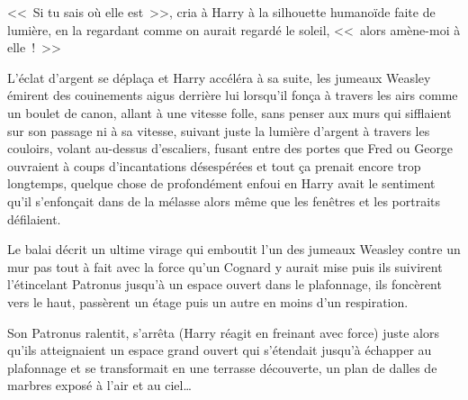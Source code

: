 <<~Si tu sais où elle est~>>, cria à Harry à la silhouette humanoïde faite de lumière, en la regardant comme on aurait regardé le soleil, <<~alors amène-moi à elle~!~>>

L'éclat d'argent se déplaça et Harry accéléra à sa suite, les jumeaux Weasley émirent des couinements aigus derrière lui lorsqu'il fonça à travers les airs comme un boulet de canon, allant à une vitesse folle, sans penser aux murs qui sifflaient sur son passage ni à sa vitesse, suivant juste la lumière d'argent à travers les couloirs, volant au-dessus d'escaliers, fusant entre des portes que Fred ou George ouvraient à coups d'incantations désespérées et tout ça prenait encore trop longtemps, quelque chose de profondément enfoui en Harry avait le sentiment qu'il s'enfonçait dans de la mélasse alors même que les fenêtres et les portraits défilaient.

Le balai décrit un ultime virage qui emboutit l'un des jumeaux Weasley contre un mur pas tout à fait avec la force qu'un Cognard y aurait mise puis ils suivirent l'étincelant Patronus jusqu'à un espace ouvert dans le plafonnage, ils foncèrent vers le haut, passèrent un étage puis un autre en moins d'un respiration.

Son Patronus ralentit, s'arrêta (Harry réagit en freinant avec force) juste alors qu'ils atteignaient un espace grand ouvert qui s'étendait jusqu'à échapper au plafonnage et se transformait en une terrasse découverte, un plan de dalles de marbres exposé à l'air et au ciel…
